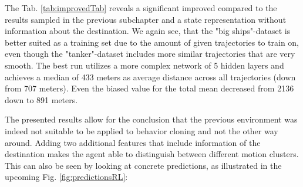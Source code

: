 The Tab. \ref{tab:improvedTab} reveals a significant improved compared to the results sampled in the previous subchapter and a state representation without information about the destination. We again see, that the "big ships"-dataset is better suited as a training set due to the amount of given trajectories to train on, even though the "tanker"-dataset includes more similar trajectories that are very smooth. The best run utilizes a more complex network of 5 hidden layers and achieves a median of 433 meters as average distance across all trajectories (down from 707 meters). Even the biased value for the total mean decreased from 2136 down to 891 meters.
\par
The presented results allow for the conclusion that the previous environment was indeed not suitable to be applied to behavior cloning and not the other way around. Adding two additional features that include information of the destination makes the agent able to distinguish between different motion clusters.\newpage
This can also be seen by looking at concrete predictions, as illustrated in the upcoming Fig. \ref{fig:predictionsRL}:

